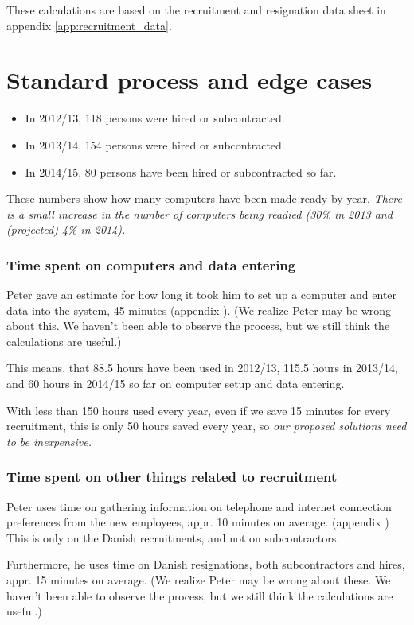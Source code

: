 \label{app:cost_benefit_analysis}
These calculations are based on the recruitment and resignation data sheet in appendix \ref{app:recruitment_data}.

\section{Standard process and edge cases}
\begin{itemize}
\item In 2012/13, 118 persons were hired or subcontracted.
\item In 2013/14, 154 persons were hired or subcontracted.
\item In 2014/15, 80 persons have been hired or subcontracted so far.
\end{itemize}
These numbers show how many computers have been made ready by year.
\emph{There is a small increase in the number of computers being readied (30\% in 2013 and (projected) 4\% in 2014).}

\subsubsection{Time spent on computers and data entering}
Peter gave an estimate for how long it took him to set up a computer and enter data into the system, 45 minutes (appendix ). (We realize Peter may be wrong about this. We haven't been able to observe the process, but we still think the calculations are useful.)

This means, that 88.5 hours have been used in 2012/13, 115.5 hours in 2013/14, and 60 hours in 2014/15 so far on computer setup and data entering.

With less than 150 hours used every year, even if we save 15 minutes for every recruitment, this is only 50 hours saved every year, so \emph{our proposed solutions need to be inexpensive.}

\subsubsection{Time spent on other things related to recruitment}
Peter uses time on gathering information on telephone and internet connection preferences from the new employees, appr. 10 minutes on average.
(appendix )
This is only on the Danish recruitments, and not on subcontractors.

Furthermore, he uses time on Danish resignations, both subcontractors and hires, appr. 15 minutes on average.
(We realize Peter may be wrong about these. We haven't been able to observe the process, but we still think the calculations are useful.)

